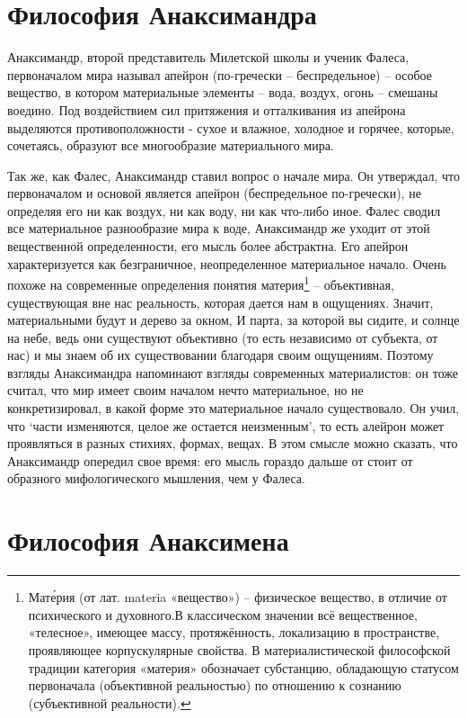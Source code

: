 \section{Философия Анаксимандра}

Анаксимандр, второй представитель Милетской школы и ученик Фалеса,
первоначалом мира называл апейрон (по-гречески -- беспредельное) --
особое вещество, в котором материальные элементы -- вода, воздух, огонь
-- смешаны воедино. Под воздействием сил притяжения и отталкивания из
апейрона выделяются противоположности - сухое и влажное, холодное и
горячее, которые, сочетаясь, образуют все многообразие материального
мира.

Так же, как Фалес, Анаксимандр ставил вопрос о начале мира. Он
утверждал, что первоначалом и основой является апейрон (беспредельное
по-гречески), не определяя его ни как воздух, ни как воду, ни как
что-либо иное. Фалес сводил все материальное разнообразие мира к воде,
Анаксимандр же уходит от этой вещественной определенности, его мысль
более абстрактна. Его апейрон характеризуется как безграничное,
неопределенное материальное начало. Очень похоже на современные
определения понятия материя\footnote{Мате́рия (от лат. materia
«вещество») -- физическое вещество, в отличие от психического и
духовного.В классическом значении всё вещественное, «телесное»,
имеющее массу, протяжённость, локализацию в пространстве, проявляющее
корпускулярные свойства. В материалистической философской традиции
категория «материя» обозначает субстанцию, обладающую статусом
первоначала (объективной реальностью) по отношению к сознанию
(субъективной реальности).} -- объективная, существующая вне нас
реальность, которая дается нам в ощущениях. Значит, материальными будут
и дерево за окном, И парта, за которой вы сидите, и солнце на небе, ведь
они существуют объективно (то есть независимо от субъекта, от нас) и мы
знаем об их существо­вании благодаря своим ощущениям. Поэтому взгляды
Анаксимандра напоминают взгляды современных материалистов: он тоже
считал, что мир имеет своим началом нечто материальное, но не
конкретизировал, в какой форме это материальное начало существовало. Он
учил, что `части изменяются, целое же остается неизменным', то есть
алейрон может проявляться в разных стихиях, формах, вещах. В этом смысле
можно сказать, что Анаксимандр опередил свое время: его мысль гораздо
дальше от­ стоит от образного мифологического мышления, чем у Фалеса.


\section{Философия Анаксимена}

